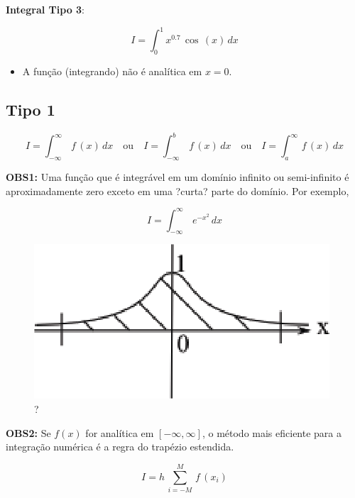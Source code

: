 \begin{enumerate}
\begin{description}
\item
\textbf{Integral Tipo 3}:

\begin{equation}
 \label{cap2:sec8:eq3}
 I = \int_0^1 x^{0.7} \, \cos\,(x) \, dx
\end{equation}

\begin{itemize}
\item 
A função (integrando) não é analítica em $x = 0$.
\end{itemize}

\end{description}

\end{enumerate}

\subsection{Tipo 1}

\[
 I = \int_{-\infty}^\infty \, f\,(x) \, dx
 \quad \mbox{ou} \quad
 I = \int_{-\infty}^b \, f\,(x) \, dx
 \quad \mbox{ou} \quad
 I = \int_a^\infty \, f\,(x) \, dx
\]

\textbf{OBS1:} Uma função que é integrável em um domínio infinito ou semi-infinito é aproximadamente zero exceto em uma ?curta? parte do domínio. Por exemplo,

\[
 I = \int_{-\infty}^\infty \, e^{-x^2} \, dx
\]

\begin{figure}[htb]
 \centering
 \includegraphics[scale=1.0]{capitulos/capitulo2/figuras/int_func_lim_inf1.eps}
 \caption{?}
 \label{fig:int_func_lim_inf1}
\end{figure}

\textbf{OBS2:} Se $f(x)$ for analítica em $[-\infty,\infty]$, o método mais eficiente para a integração numérica é a regra do trapézio estendida.

\[
 I = h \, \sum_{i=-M}^M \, f\,(x_i)
\]

